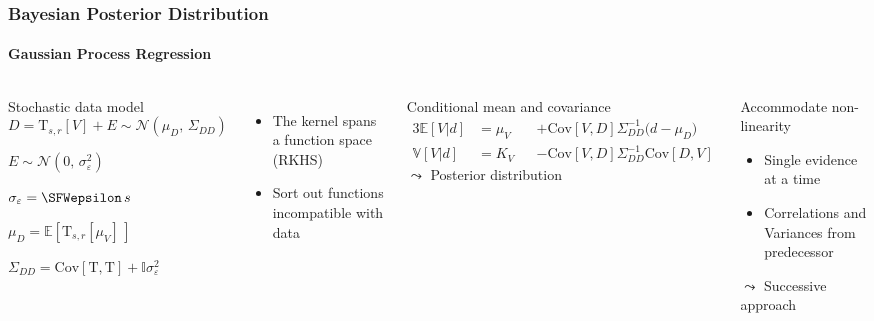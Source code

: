 \documentclass[aspectratio=169, t, 10pt]{beamer}
\newcommand\Mean[1]{\mathbb{E}\!\left[#1\right]}
\newcommand\Var[1]{\mathbb{V}\!\left[#1\right]}
\newcommand\Cov[2]{\mathrm{Cov}\!\left[#1,#2\right]}
\newcommand\Gauss[2]{\mathcal{N}\!\left({#1},\,{#2}\right)}
\newcommand{\Identity}{\mathbb{I}}
\begin{document}
\begin{frame}
    \frametitle{Bayesian Posterior Distribution}
    \framesubtitle{Gaussian Process Regression}

\begin{columns}

    \begin{block}{Stochastic data model}
        \begin{equation}
            D = \mathrm T_{s,r}[V] + E \sim \Gauss{\mu_D}{\Sigma_{DD}}
        \end{equation}
        \begin{description}[labelwidth=25mm]
            \item [Error model]        $E\sim \Gauss{0}{\sigma_\varepsilon^2}$
            \item [Uncertainty]        $\sigma_\varepsilon = \SFWepsilon\,s$
            \item [Prior travel times] $\mu_D = \Mean{\mathrm T_{s,r}[\mu_V]\,}$
            \item [Covariance matrix]  $\Sigma_{DD} = \Cov{\mathrm T}{\mathrm T}  + \Identity \sigma_\varepsilon^2$
        \end{description}
    \end{block}

    \begin{itemize}
        \item The kernel spans a function space (RKHS)
        \item Sort out functions incompatible with data
    \end{itemize}


    \begin{exampleblock}{Conditional mean and covariance}
        \setlength\abovedisplayskip{0pt}
        \begin{alignat}{3}
            \Mean{V|d} &= \mu_V &&+ \Cov VD \Sigma_{DD}^{-1} \big( d - \mu_{D} \big)
            \\
            \Var{V|d}  &= K_V   &&- \Cov VD \Sigma_{DD}^{-1} \Cov DV
        \end{alignat}
        \hfill {\Large $\leadsto$} Posterior distribution \phantom{p}
    \end{exampleblock}

    \begin{alertblock}{Accommodate non-linearity}
        \begin{itemize}
            \item Single evidence at a time
            \item Correlations and Variances from predecessor
        \end{itemize}
        \hfill {\Large $\leadsto$} Successive approach ~
    \end{alertblock}

\end{columns}

\end{frame}
\end{document}
